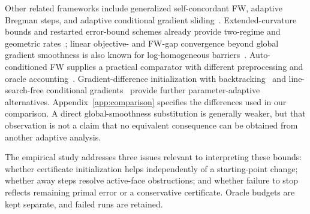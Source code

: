 Other related frameworks include generalized self-concordant FW,
adaptive Bregman steps, and adaptive conditional gradient
sliding~\cite{selfconcordant,bregmanfw,adcgs}.
Extended-curvature bounds and restarted error-bound schemes already
provide two-regime and geometric rates~\cite{wirth,restartfw};
linear objective- and FW-gap convergence beyond global gradient
smoothness is also known for log-homogeneous barriers~\cite{zhao}.
Auto-conditioned FW supplies a practical comparator with different
preprocessing and oracle accounting~\cite{autoconditioned}.
Gradient-difference initialization with backtracking~\cite{khademi}
and line-search-free conditional gradients~\cite{yagishita}
provide further parameter-adaptive alternatives.
Appendix~\ref{app:comparison} specifies the differences used in our
comparison. A direct global-smoothness substitution is generally weaker,
but that observation is not a claim that no equivalent consequence
can be obtained from another adaptive analysis.

The empirical study addresses three issues relevant to interpreting
these bounds: whether certificate initialization helps independently of
a starting-point change; whether away steps resolve active-face
obstructions; and whether failure to stop reflects remaining primal
error or a conservative certificate. Oracle budgets are kept separate,
and failed runs are retained.
